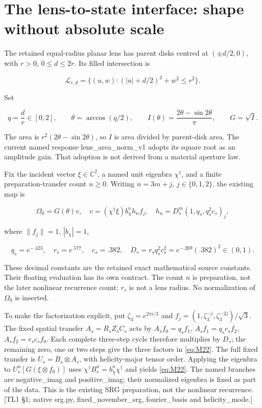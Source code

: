 \documentclass[11pt,a4paper]{article}
\begin{document}
\section{The lens-to-state interface: shape without absolute scale}

The retained equal-radius planar lens has parent disks centred at \((\pm d/2,0)\), with \(r>0\), \(0\le d\le2r\). Its filled intersection is

\[
\mathcal L_{r,d}=\{(u,w):(|u|+d/2)^2+w^2\le r^2\}.
\tag{M20}\label{eq:M20}
\]

Set

\[
q=\frac dr\in[0,2],\qquad \theta=\arccos(q/2),\qquad
I(\theta)=\frac{2\theta-\sin2\theta}{\pi},\qquad G=\sqrt I.
\tag{M21}\label{eq:M21}
\]

The area is \(r^2(2\theta-\sin2\theta)\), so \(I\) is area divided by parent-disk area. The current named response lens\_\allowbreak{}area\_\allowbreak{}norm\_\allowbreak{}v1 adopts its square root as an amplitude gain. That adoption is not derived from a material aperture law.

Fix the incident vector \(\xi\in\mathbb C^2\), a named unit eigenbra \(\chi^\dagger\), and a finite preparation-transfer count \(n\ge0\). Writing \(n=3m+j\), \(j\in\{0,1,2\}\), the existing map is

\[
\boxed{\Omega_0=G(\theta)v},\quad
v=(\chi^\dagger\xi)b_\chi^n h_n f_j,\quad
h_n=D_s^m(1,q_s,q_s^2c_s)_j,
\tag{M22}\label{eq:M22}
\]

where \(\|f_j\|=1\), \(|b_\chi|=1\),

\[
q_s=e^{-.423},\quad r_s=e^{.577},\quad c_s=.382,\quad
D_s=r_sq_s^2c_s^2=e^{-.269}(.382)^2\in(0,1).
\tag{M23}\label{eq:M23}
\]

These decimal constants are the retained exact mathematical source constants. Their floating evaluation has its own contract. The count \(n\) is preparation, not the later nonlinear recurrence count; \(r_s\) is not a lens radius. No normalization of \(\Omega_0\) is inserted.

To make the factorization explicit, put \(\zeta_3=e^{2\pi i/3}\) and \(f_j=(1,\zeta_3^{-j},\zeta_3^{-2j})/\sqrt3\). The fixed spatial transfer \(A_s=R_sZ_sC_s\) acts by \(A_sf_0=q_sf_1\), \(A_sf_1=q_sc_sf_2\), \(A_sf_2=r_sc_sf_0\). Each complete three-step cycle therefore multiplies by \(D_s\); the remaining zero, one or two steps give the three factors in \eqref{eq:M22}. The full fixed transfer is \(U_s=B_s\otimes A_s\), with helicity-major tensor order. Applying the eigenbra to \(U_s^n[G(\xi\otimes f_0)]\) uses \(\chi^\dagger B_s^n=b_\chi^n\chi^\dagger\) and yields \eqref{eq:M22}. The named branches are negative\_\allowbreak{}imag and positive\_\allowbreak{}imag; their normalized eigenbra is fixed as part of the data. This is the existing SRG preparation, not the nonlinear recurrence. [TL1 \S{}1; native srg.py, fixed\_\allowbreak{}november\_\allowbreak{}srg, fourier\_\allowbreak{}basis and helicity\_\allowbreak{}mode.]
\end{document}
